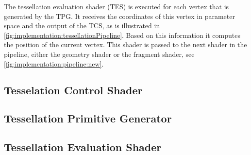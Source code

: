 	The tessellation evaluation shader (TES) is executed for each vertex that is generated by the TPG. 
	It receives the coordinates of this vertex in parameter space and the output of the TCS, as is illustrated in \cref{fig:implementation:tessellationPipeline}. 
	Based on this information it computes the position of the current vertex. 
	This shader is passed to the next shader in the pipeline, either the geometry shader or the fragment shader, see \cref{fig:implementation:pipeline:new}.

\subsection{Tesselation Control Shader}
\label{ss:implementation:tcs}



\subsection{Tessellation Primitive Generator}
\label{ss:implementation:tpg}



\subsection{Tessellation Evaluation Shader}
\label{ss:implementation:tes}


